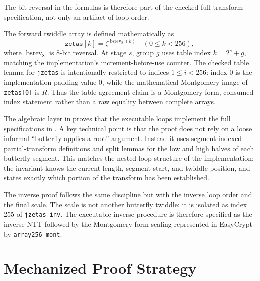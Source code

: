 \documentclass[10pt,twocolumn]{article}
\newcommand{\ec}{EasyCrypt}
\begin{document}
The bit reversal in the formulas is therefore part of the checked full-transform
specification, not only an artifact of loop order.

The forward twiddle array is defined mathematically as
\[
  \texttt{zetas}[k] = \zeta^{\operatorname{bsrev}_8(k)} \quad (0 \leq k < 256),
\]
where \(\operatorname{bsrev}_8\) is 8-bit reversal. At stage \(s\), group \(g\)
uses table index \(k=2^s+g\), matching the implementation's increment-before-use
counter. The checked table lemma for \texttt{jzetas} is intentionally restricted
to indices \(1\leq i<256\): index 0 is the implementation padding value 0, while
the mathematical Montgomery image of \texttt{zetas[0]} is \(R\). Thus the table
agreement claim is a Montgomery-form, consumed-index statement rather than a
raw equality between complete arrays.

The algebraic layer in  proves that the executable loops
implement the full specifications in . A key technical
point is that the proof does not rely on a loose informal ``butterfly applies a
root'' argument. Instead it uses segment-indexed partial-transform definitions
and split lemmas for the low and high halves of each butterfly segment. This
matches the nested loop structure of the implementation: the invariant knows the
current length, segment start, and twiddle position, and states exactly which
portion of the transform has been established.

The inverse proof follows the same discipline but with the inverse loop order
and the final scale. The scale is not another butterfly twiddle: it is isolated
as index 255 of \texttt{jzetas\_inv}. The executable inverse procedure is
therefore specified as the inverse NTT followed by the Montgomery-form scaling
represented in \ec{} by \texttt{array256\_mont}.

\section{Mechanized Proof Strategy}
\end{document}
